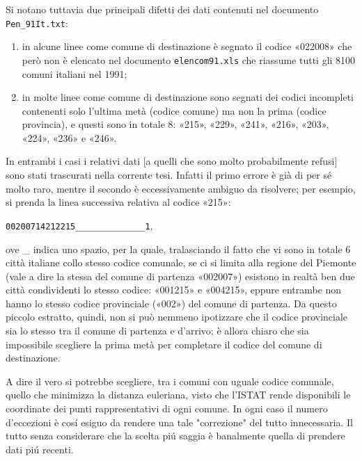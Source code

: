     Si notano tuttavia due principali difetti dei dati contenuti nel documento \texttt{Pen\_91It.txt}:

    \begin{enumerate}[
      label=\arabic*.,
      topsep=0.5em,
      parsep=0em,
      itemsep=0.25em,
      leftmargin=2em,
      rightmargin=1.5em,
    ]
      \item in alcune linee come comune di destinazione è segnato il codice «022008» che però non è elencato nel documento \texttt{elencom91.xls} che riassume tutti gli 8100 comuni italiani nel 1991;
      \item in molte linee come comune di destinazione sono segnati dei codici incompleti contenenti solo l'ultima metà (codice comune) ma non la prima (codice provincia), e questi sono in totale 8: «215», «229», «241», «216», «203», «224», «236» e «246».
    \end{enumerate}

    In entrambi i casi i relativi dati [a quelli che sono molto probabilmente refusi] sono stati trascurati nella corrente tesi. Infatti il primo errore è già di per sé molto raro, mentre il secondo è eccessivamente ambiguo da risolvere; per esempio, si prenda la linea successiva relativa al codice «215»:
    \begin{center}
      \texttt{00200714212215\_\_\_\_\_\_\_\_\_\_\_\_\_\_1},
    \end{center}
    ove \_ indica uno spazio, per la quale, tralasciando il fatto che vi sono in totale 6 città italiane collo stesso codice comunale, se ci si limita alla regione del Piemonte (vale a dire la stessa del comune di partenza «002007») esistono in realtà ben due città condividenti lo stesso codice: «001215» e «004215», eppure entrambe non hanno lo stesso codice provinciale («002») del comune di partenza. Da questo piccolo estratto, quindi, non si può nemmeno ipotizzare che il codice provinciale sia lo stesso tra il comune di partenza e d'arrivo; è allora chiaro che sia impossibile scegliere la prima metà per completare il codice del comune di destinazione.

    \begin{oss}
      A dire il vero si potrebbe scegliere, tra i comuni con uguale codice comunale, quello che minimizza la distanza euleriana, visto che l'ISTAT \cite{ISTATLimiti1991} rende disponibili le coordinate dei punti rappresentativi di ogni comune. In ogni caso il numero d'eccezioni è cosí esiguo da rendere una tale "correzione" del tutto innecessaria\footnotemark{}. Il tutto senza considerare che la scelta piú saggia è banalmente quella di prendere dati piú recenti\footnotemark{}.
    \end{oss}

